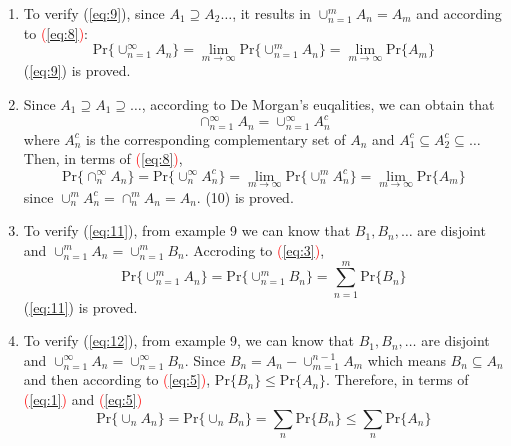 \documentclass[UTF8]{article}
\begin{document}
\begin{enumerate}[1.]
        Then, since $B_1,B_2,\dots$ are disjoint, according to \textcolor{red}{(\ref{eq:1})} and \textcolor{red}{(\ref{eq:3})}
        \begin{equation*}
            \text{Pr}\{\cup^\infty_{n=1}A_n\}=\text{Pr}\{\cup^\infty_{n=1}B_n\}=\lim_{m\rightarrow\infty}\sum^m_{n=1}\text{Pr}\{B_n\}=\lim_{m\rightarrow\infty}\text{Pr}\{\cup^m_{n=1}B_n\}=\lim_{m\rightarrow\infty}\text{Pr}\{\cup^m_{n=1}A_n\}
        \end{equation*}
        (\ref{eq:8}) is proved
        \item To verify (\ref{eq:9}), since $A_1\supseteq A_2\dots$, it results in $\cup^m_{n=1}A_n=A_m$ and according to \textcolor{red}{(\ref{eq:8})}:
        \begin{equation*}
            \text{Pr}\big\{\cup^\infty_{n=1}A_n\big\}=\lim_{m\rightarrow\infty}\text{Pr}\{\cup^m_{n=1}A_n\}=\lim_{m\rightarrow\infty}\text{Pr}\{A_m\}
        \end{equation*}
        (\ref{eq:9}) is proved.
        \item Since $A_1\supseteq A_1\supseteq\dots$, according to De Morgan's euqalities, we can obtain that 
        \begin{equation*}
            \cap^\infty_{n=1}A_n=\cup^\infty_{n=1}A_n^c
        \end{equation*}
        where $A^c_n$ is the corresponding complementary set of $A_n$ and $A^c_1\subseteq A^c_2\subseteq\dots$ Then, in terms of \textcolor{red}{(\ref{eq:8})},
        \begin{equation*}
            \text{Pr}\{\cap^\infty_nA_n\}=\text{Pr}\{\cup^\infty_nA^c_n\}=\lim_{m\rightarrow\infty}\text{Pr}\{\cup^m_nA^c_n\}=\lim_{m\rightarrow\infty}\text{Pr}\{A_m\}
        \end{equation*}
        since $\cup^m_nA^c_n=\cap^m_nA_n=A_n$. (10) is proved.
        \item To verify (\ref{eq:11}), from example 9 we can know that $B_1,B_n,\dots$ are disjoint and $\cup^m_{n=1}A_n=\cup^m_{n=1}B_n$. Accroding to \textcolor{red}{(\ref{eq:3})},
        \begin{equation*}
            \text{Pr}\{\cup^m_{n=1}A_n\}=\text{Pr}\{\cup^m_{n=1}B_n\}=\sum^m_{n=1}\text{Pr}\{B_n\}
        \end{equation*}
        (\ref{eq:11}) is proved.
        \item To verify (\ref{eq:12}), from example 9, we can know that $B_1,B_n,\dots$ are disjoint and $\cup^\infty_{n=1}A_n=\cup^\infty_{n=1}B_n$. Since $B_n=A_n-\cup^{n-1}_{m=1}A_m$ which means $B_n\subseteq A_n$ and then according to \textcolor{red}{(\ref{eq:5})}, $\text{Pr}\{B_n\}\leq\text{Pr}\{A_n\}$. Therefore, in terms of \textcolor{red}{(\ref{eq:1})} and \textcolor{red}{(\ref{eq:5})}
        \begin{equation*}
            \text{Pr}\{\cup_nA_n\}=\text{Pr}\{\cup_nB_n\}=\sum_n\text{Pr}\{B_n\}\leq\sum_n\text{Pr}\{A_n\}
        \end{equation*}
    \end{enumerate}
\end{document}

